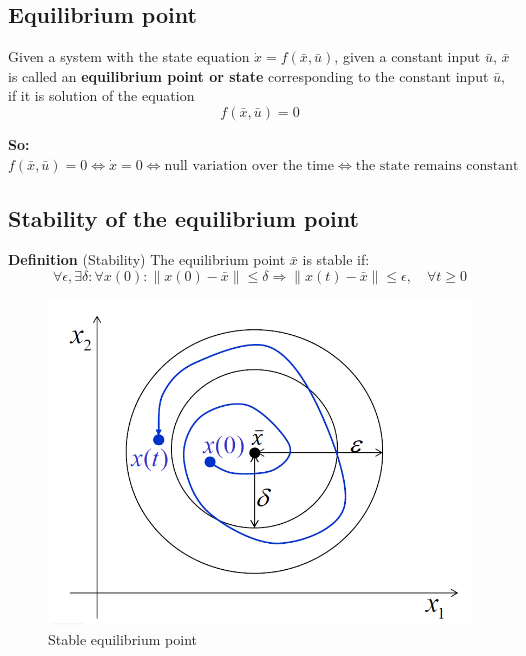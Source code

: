 \subsection{Equilibrium point} Given a system with the state equation $\dot{x}=f(\bar{x},\bar{u})$, given a constant input $\bar{u}$, \textbf{$\bar{x}$} is called an \textbf{equilibrium point or state} corresponding to the constant input \textbf{$\bar{u}$}, if it is solution of the equation $$f(\bar{x}, \bar{u})=0$$

\noindent
\textbf{So:} $f(\bar{x}, \bar{u})=0 \Longleftrightarrow \dot{x}=0 \Longleftrightarrow \textrm{null variation over the time} \Longleftrightarrow \textrm{the state remains constant}$

\subsection{Stability of the equilibrium point}

\textbf{Definition} (Stability) The equilibrium point $\bar{x}$ is stable if: 
\begin{equation*}
    \forall \epsilon, \exists \delta: \forall x(0): \lVert x(0)-\bar{x} \rVert \le \delta \Longrightarrow \lVert x(t)-\bar{x} \rVert \le \epsilon, \quad \forall t \ge 0
\end{equation*}
\begin{figure}[h]
    \centering
    \includegraphics[scale=0.5]{NonLinearControl/images/EqStable.png}
    \caption{Stable equilibrium point}
    \label{fig:enter-label}
\end{figure}

